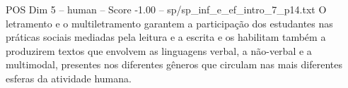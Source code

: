 \begin{textsample}{POS Dim 5 – human – Score -1.00 – sp/sp\_inf\_e\_ef\_intro\_7\_p14.txt}  \label{ex:f5_pos_006}
O letramento e o multiletramento garantem a participação dos estudantes nas práticas sociais mediadas pela leitura e a escrita e os habilitam também a produzirem textos que envolvem as linguagens verbal, a não-verbal e a multimodal, presentes nos diferentes gêneros que circulam nas mais diferentes esferas da atividade humana.

\end{textsample}
